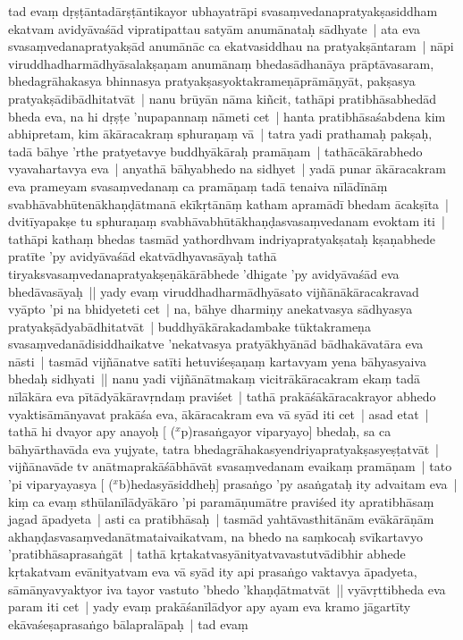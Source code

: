\documentclass[article,12pt,a4paper]{memoir}
\newcommand{\corr}[1]{($^{x}$#1)}
\begin{document}
	  \pstart tad evaṃ dṛṣṭāntadārṣṭāntikayor ubhayatrāpi svasaṃvedanapratyakṣasiddham ekatvam avidyāvaśād vipratipattau satyām anumānataḥ sādhyate | ata eva svasaṃvedanapratyakṣād anumānāc ca ekatvasiddhau na pratyakṣāntaram | nāpi viruddhadharmādhyāsalakṣaṇam anumānaṃ bhedasādhanāya prāptāvasaram, bhedagrāhakasya bhinnasya pratyakṣasyoktakrameṇāprāmāṇyāt, pakṣasya pratyakṣādibādhitatvāt | \label{thakur75-143.6} nanu brūyān nāma kiñcit, tathāpi pratibhāsabhedād bheda eva, na hi dṛṣṭe 'nupapannaṃ nāmeti cet | hanta pratibhāsaśabdena kim abhipretam, kim ākāracakraṃ sphuraṇaṃ vā | tatra yadi prathamaḥ pakṣaḥ, tadā bāhye 'rthe pratyetavye buddhyākāraḥ pramāṇam | tathācākārabhedo vyavahartavya eva | anyathā bāhyabhedo na sidhyet | yadā punar ākāracakram eva prameyam svasaṃvedanaṃ ca pramāṇaṃ tadā tenaiva nīlādīnāṃ svabhāvabhūtenākhaṇḍātmanā ekīkṛtānāṃ katham apramādī bhedam ācakṣīta | \label{thakur75-143.12} dvitīyapakṣe tu sphuraṇaṃ svabhāvabhūtākhaṇḍasvasaṃvedanam evoktam iti | tathāpi kathaṃ bhedas tasmād yathordhvam indriyapratyakṣataḥ kṣaṇabhede pratīte 'py avidyāvaśād ekatvādhyavasāyaḥ tathā tiryaksvasaṃvedanapratyakṣeṇākārābhede 'dhigate 'py avidyāvaśād eva bhedāvasāyaḥ || \label{thakur75-143.15} yady evaṃ viruddhadharmādhyāsato vijñānākāracakravad vyāpto 'pi na bhidyeteti cet | na, bāhye dharmiṇy anekatvasya sādhyasya pratyakṣādyabādhitatvāt | buddhyākārakadambake tūktakrameṇa svasaṃvedanādisiddhaikatve 'nekatvasya pratyākhyānād bādhakāvatāra eva nāsti | tasmād vijñānatve satīti hetuviśeṣaṇaṃ kartavyam yena bāhyasyaiva bhedaḥ sidhyati || \label{thakur75-143.20} nanu yadi vijñānātmakaṃ vicitrākāracakram ekaṃ tadā nīlākāra eva pītādyākāravṛndaṃ praviśet | tathā prakāśākāracakrayor abhedo vyaktisāmānyavat prakāśa eva, ākāracakram eva vā syād iti cet | asad etat | tathā hi dvayor apy anayoḥ [ {\corr prasaṅgayor viparyayo}] bhedaḥ, sa ca bāhyārthavāda eva yujyate, tatra bhedagrāhakasyendriyapratyakṣasyeṣṭatvāt | vijñānavāde tv anātmaprakāśābhāvāt svasaṃvedanam evaikaṃ pramāṇam | tato 'pi viparyayasya [ {\corr bhedasyāsiddheḥ}] prasaṅgo 'py asaṅgataḥ ity advaitam eva | \label{thakur75-143.26} kiṃ ca evaṃ sthūlanīlādyākāro 'pi paramāṇumātre praviśed ity apratibhāsaṃ jagad āpadyeta | asti ca pratibhāsaḥ | tasmād yahtāvasthitānām evākārāṇām akhaṇḍasvasaṃvedanātmataivaikatvam, na bhedo na saṃkocaḥ svīkartavyo 'pratibhāsaprasaṅgāt | tathā kṛtakatvasyānityatvavastutvādibhir abhede kṛtakatvam evānityatvam eva vā syād ity api prasaṅgo vaktavya āpadyeta, sāmānyavyaktyor iva tayor vastuto 'bhedo 'khaṇḍātmatvāt || \label{thakur75-143.31} vyāvṛttibheda eva param iti cet | yady evaṃ prakāśanīlādyor apy ayam eva kramo jāgartīty ekāvaśeṣaprasaṅgo bālapralāpaḥ | tad evaṃ
	\pend
      
\end{document}
